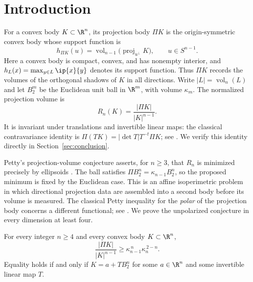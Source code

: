 \begin{abstract}
We prove that ellipsoids uniquely minimize the volume of the projection body
among convex bodies of fixed volume in every dimension at least four.
This proves Petty's projection-volume conjecture in these dimensions.
\end{abstract}
\section{Introduction}
\label{sec:introduction}

For a convex body $K\subset\R^n$, its projection body $\Pi K$ is the
origin-symmetric convex body whose support function is
\[
 h_{\Pi K}(u)=\operatorname{vol}_{n-1}
       \bigl(\operatorname{proj}_{u^\perp}K\bigr),
       \qquad u\in S^{n-1}.
\]
Here a convex body is compact, convex, and has nonempty interior, and
$h_L(x)=\max_{y\in L}\ip{x}{y}$ denotes its support function.
Thus $\Pi K$ records the volumes of the orthogonal shadows of $K$ in
all directions. Write $|L|=\operatorname{vol}_n(L)$ and let $B_2^m$
be the Euclidean unit ball in $\R^m$, with volume $\kappa_m$.
The normalized projection volume is
\[
 R_n(K)=\frac{|\Pi K|}{|K|^{n-1}}.
\]
It is invariant under translations and invertible linear maps: the
classical contravariance identity is
$\Pi(TK)=|\det T|T^{-t}\Pi K$; see
\cite[Equation~(1)]{Ludwig2002}. We verify this identity directly in
Section~\ref{sec:conclusion}.

Petty's projection-volume conjecture asserts, for $n\ge3$, that
$R_n$ is minimized precisely by ellipsoids \cite{Petty1971}.
The ball satisfies $\Pi B_2^n=\kappa_{n-1}B_2^n$, so the proposed
minimum is fixed by the Euclidean case. This is an affine isoperimetric
problem in which directional projection data are assembled into a
second body before its volume is measured. The classical Petty
inequality for the \emph{polar} of the projection body concerns a
different functional; see \cite[Section~18.6]{Gardner2002}.
We prove the unpolarized conjecture in every dimension at least four.

\begin{theorem}\label{thm:main}
For every integer $n\ge4$ and every convex body $K\subset\R^n$,
\begin{equation}\label{eq:main}
 \frac{|\Pi K|}{|K|^{n-1}}
 \ge \kappa_{n-1}^{\,n}\kappa_n^{\,2-n}.
\end{equation}
Equality holds if and only if $K=a+TB_2^n$ for some $a\in\R^n$ and some
invertible linear map $T$.
\end{theorem}


